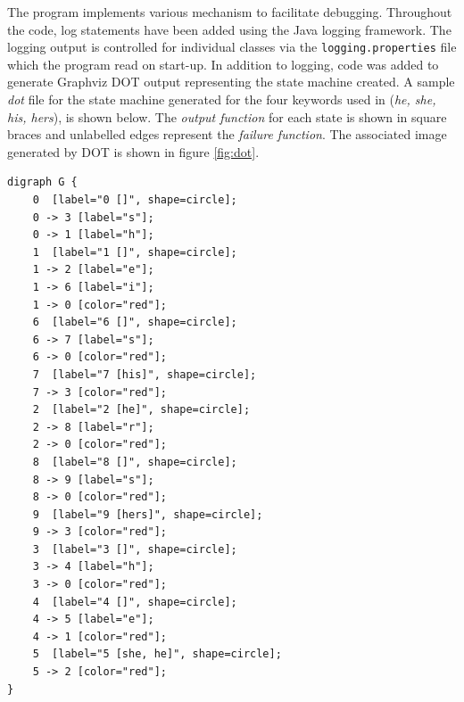 \documentclass[10pt]{report}
\begin{document}
The program implements various mechanism to facilitate
debugging. Throughout the code, log statements have been added using
the Java logging framework. The logging output is controlled for
individual classes via the \texttt{logging.properties} file which the
program read on start-up. In addition to logging, code was added to
generate Graphviz DOT\cite{RefWorks:110} output representing the state
machine created. A sample \textit{dot} file for the state machine
generated for the four keywords used in \cite{RefWorks:103}
(\textit{he, she, his, hers}), is shown below. The \textit{output
  function} for each state is shown in square braces and unlabelled
edges represent the \textit{failure function}.  The associated image
generated by DOT is shown in figure \ref{fig:dot}.


\begin{verbatim}
digraph G {
	0  [label="0 []", shape=circle];
	0 -> 3 [label="s"];
	0 -> 1 [label="h"];
	1  [label="1 []", shape=circle];
	1 -> 2 [label="e"];
	1 -> 6 [label="i"];
	1 -> 0 [color="red"];
	6  [label="6 []", shape=circle];
	6 -> 7 [label="s"];
	6 -> 0 [color="red"];
	7  [label="7 [his]", shape=circle];
	7 -> 3 [color="red"];
	2  [label="2 [he]", shape=circle];
	2 -> 8 [label="r"];
	2 -> 0 [color="red"];
	8  [label="8 []", shape=circle];
	8 -> 9 [label="s"];
	8 -> 0 [color="red"];
	9  [label="9 [hers]", shape=circle];
	9 -> 3 [color="red"];
	3  [label="3 []", shape=circle];
	3 -> 4 [label="h"];
	3 -> 0 [color="red"];
	4  [label="4 []", shape=circle];
	4 -> 5 [label="e"];
	4 -> 1 [color="red"];
	5  [label="5 [she, he]", shape=circle];
	5 -> 2 [color="red"];
}
\end{verbatim}
\end{document}
